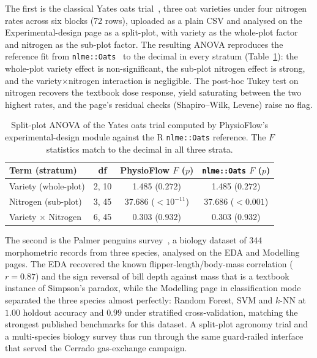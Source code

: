 \documentclass[preprint,12pt,a4paper]{elsarticle}
\begin{document}
The first is the classical Yates oats trial~\cite{Yates1935}, three oat varieties under four nitrogen rates across six blocks (72 rows), uploaded as a plain CSV and analysed on the Experimental-design page as a split-plot, with variety as the whole-plot factor and nitrogen as the sub-plot factor. The resulting ANOVA reproduces the reference fit from \texttt{nlme::Oats}~\cite{Pinheiro2000} to the decimal in every stratum (Table~\ref{tbl:oats}): the whole-plot variety effect is non-significant, the sub-plot nitrogen effect is strong, and the variety$\times$nitrogen interaction is negligible. The post-hoc Tukey test on nitrogen recovers the textbook dose response, yield saturating between the two highest rates, and the page's residual checks (Shapiro--Wilk, Levene) raise no flag.

\begin{table}[!h]
\centering
\footnotesize
\begin{tabular}{lccc}
\toprule
\textbf{Term (stratum)} & \textbf{df} & \textbf{PhysioFlow $F$ ($p$)} & \textbf{\texttt{nlme::Oats} $F$ ($p$)} \\
\midrule
Variety (whole-plot)      & 2, 10 & 1.485 ($0.272$)        & 1.485 ($0.272$) \\
Nitrogen (sub-plot)       & 3, 45 & 37.686 ($<10^{-11}$)   & 37.686 ($<0.001$) \\
Variety $\times$ Nitrogen & 6, 45 & 0.303 ($0.932$)        & 0.303 ($0.932$) \\
\bottomrule
\end{tabular}
\caption{Split-plot ANOVA of the Yates oats trial computed by PhysioFlow's experimental-design module against the R \texttt{nlme::Oats} reference. The $F$ statistics match to the decimal in all three strata.}\label{tbl:oats}
\end{table}

The second is the Palmer penguins survey~\cite{Gorman2014}, a biology dataset of 344 morphometric records from three species, analysed on the EDA and Modelling pages. The EDA recovered the known flipper-length/body-mass correlation ($r=0.87$) and the sign reversal of bill depth against mass that is a textbook instance of Simpson's paradox, while the Modelling page in classification mode separated the three species almost perfectly: Random Forest, SVM and $k$-NN at $1.00$ holdout accuracy and $0.99$ under stratified cross-validation, matching the strongest published benchmarks for this dataset. A split-plot agronomy trial and a multi-species biology survey thus run through the same guard-railed interface that served the Cerrado gas-exchange campaign.
\end{document}
